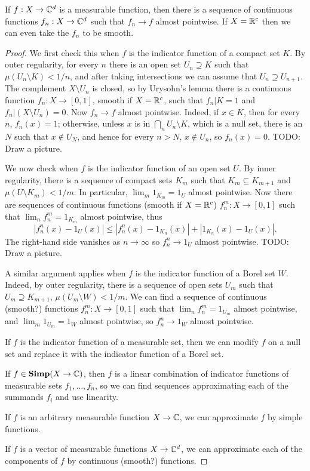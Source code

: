 \begin{lemma}
\label{smooth functions are pointwise dense}
If $f: X \to \mathbb{C}^d$ is a measurable function, then there is a sequence of continuous functions $f_{n}: X \to \mathbb{C}^d$ such that $f_{n} \to f$ almost pointwise.
If $X = \mathbb{R}^c$ then we can even take the $f_{n}$ to be smooth.
\end{lemma}
\begin{proof}
We first check this when $f$ is the indicator function of a compact set $K$.
By outer regularity, for every $n$ there is an open set $U_{n} \supseteq K$ such that $\mu(U_{n} \setminus K) < 1/n$, and after taking intersections we can assume that $U_{n} \supseteq U_{n+1}$.
The complement $X \setminus U_{n}$ is closed, so by Urysohn's lemma there is a continuous function $f_{n}: X \to [0, 1]$, smooth if $X = \mathbb{R}^c$, such that $f_{n}|K = 1$ and $f_{n}|(X \setminus U_{n}) = 0$.
Now $f_{n} \to f$ almost pointwise. Indeed, if $x \in K$, then for every $n$, $f_{n}(x) = 1$; otherwise, unless $x$ is in $\bigcap_{n} U_{n} \setminus K$, which is a null set, there is an $N$ such that $x \notin U_N$, and hence for every $n > N$, $x \notin U_{n}$, so $f_{n}(x) = 0$.
TODO: Draw a picture.

We now check when $f$ is the indicator function of an open set $U$.
By inner regularity, there is a sequence of compact sets $K_{m}$ such that $K_{m} \subseteq K_{m+1}$ and $\mu(U \setminus K_{m}) < 1/m$.
In particular, $\lim_{m} 1_{K_{m}} = 1_U$ almost pointwise.
Now there are sequences of continuous functions (smooth if $X = \mathbb{R}^c$) $f_{n}^m: X \to [0, 1]$ such that $\lim_{n} f_{n}^{m} = 1_{K_{m}}$ almost pointwise, thus
\[|f_{n}^n(x) - 1_U(x)| \leq |f_{n}^n(x) - 1_{K_{n}}(x)| + |1_{K_{n}}(x) - 1_U(x)|.\]
The right-hand side vanishes as $n \to \infty$ so $f_{n}^{n} \to 1_U$ almost pointwise.
TODO: Draw a picture.

A similar argument applies when $f$ is the indicator function of a Borel set $W$.
Indeed, by outer regularity, there is a sequence of open sets $U_{m}$ such that $U_{m} \supseteq K_{m+1}$, $\mu(U_{m} \setminus W) < 1/m$.
We can find a sequence of continuous (smooth?) functions $f_{n}^m: X \to [0, 1]$ such that $\lim_{n} f_{n}^{m} = 1_{U_{m}}$ almost pointwise, and $\lim_{m} 1_{U_{m}} = 1_W$ almost pointwise, so $f_{n}^{n} \to 1_W$ almost pointwise.

If $f$ is the indicator function of a measurable set, then we can modify $f$ on a null set and replace it with the indicator function of a Borel set.

If $f \in \mathbf{Simp}(X \to \mathbb{C})$, then $f$ is a linear combination of indicator functions of measurable sets $f_1, \dots, f_{n}$, so we can find sequences approximating each of the summands $f_i$ and use linearity.

If $f$ is an arbitrary measurable function $X \to \mathbb{C}$, we can approximate $f$ by simple functions.

If $f$ is a vector of measurable functions $X \to \mathbb{C}^d$, we can approximate each of the components of $f$ by continuous (smooth?) functions.
\end{proof}

